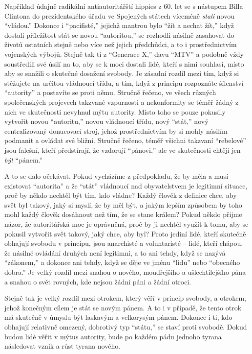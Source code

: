 \documentclass{book}
\begin{document}
Například údajně radikální antiautoritářští hippies z 60. let se s nástupem Billa Clintona do prezidentského úřadu ve Spojených státech víceméně \emph{stali} novou \enquote{vládou.} Dokonce i \enquote{pacifisté,} jejichž mantrou bylo \enquote{žít a nechat žít,} když dostali příležitost stát se novou \enquote{autoritou,} se rozhodli násilně zasahovat do životů ostatních stejně nebo více než jejich předchůdci, a to i prostřednictvím vojenských výbojů. Stejně tak ti z \enquote{Generace X,} davu \enquote{MTV} a podobně vždy soustředili své úsilí na to, aby se k moci dostali lidé, kteří s nimi souhlasí, místo aby se snažili o skutečné dosažení svobody. Je zásadní rozdíl mezi tím, když si stěžujete na určitou vládnoucí třídu, a tím, když z principu rozpoznáte šílenství \enquote{autority} a postavíte se proti němu. Stručně řečeno, ve všech různých společenských projevech takzvané vzpurnosti a nekonformity se téměř žádný z nich ve skutečnosti nevyhnul mýtu autority. Místo toho se pouze pokusily vytvořit novou \enquote{autoritu,} novou vládnoucí třídu, nový \enquote{stát,} nový centralizovaný donucovací stroj, jehož prostřednictvím by si mohly násilím podmanit a ovládat své bližní. Stručně řečeno, téměř všichni takzvaní \enquote{rebelové} jsou falešní, kteří předstírají, že vzdorují \enquote{pánovi,} ale ve skutečnosti chtějí jen \emph{být} \enquote{pánem.}

A to se dalo očekávat. Pokud vycházíme z předpokladu, že by měla a musí existovat \enquote{autorita} a že \enquote{stát} vládnoucí nad obyvatelstvem je legitimní situace, proč by někdo nechtěl být tím, kdo vládne? Každý člověk z definice chce, aby svět byl takový, jaký si myslí, že by měl být, a jakým lepším způsobem by toho mohl každý člověk dosáhnout než tím, že se stane králem? Pokud někdo přijme názor, že autoritářská moc je oprávněná, proč by ji nechtěl využít k tomu, aby se pokusil vytvořit svět takový, jaký chce, aby byl? Proto jediní lidé, kteří skutečně obhajují svobodu v principu, jsou anarchisté a voluntaristé -- lidé, kteří chápou, že násilné ovládání druhých není legitimní, a to ani tehdy, když se nazývá \enquote{zákonem,} a dokonce ani tehdy, když se děje ve jménu \enquote{lidu} nebo \enquote{obecného dobra.} Je velký rozdíl mezi snahou o nového, moudřejšího a ušlechtilejšího pána a snahou o svět rovných, kde nejsou žádní páni a žádní otroci.

Stejně tak je velký rozdíl mezi otrokem, který věří v princip svobody, a otrokem, jehož konečným cílem je stát se novým pánem. A to i v případě, že tento otrok má skutečně v úmyslu být laskavým a velkorysým pánem. Dokonce i ti, kdo obhajují relativně omezený, dobrotivý typ \enquote{státu,} se staví proti svobodě. Dokud budou lidé věřit v mýtus autority, bude po každém pádu jednoho tyrana následovat vznik a růst tyrana nového.
\end{document}
